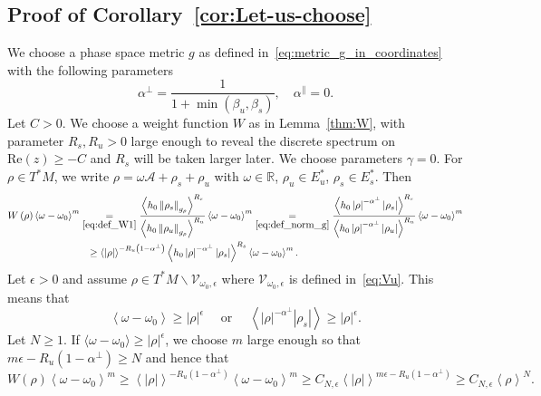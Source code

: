 \documentclass[AHL,Unicode,longabstracts,published]{cedram}
\newcommand{\clV}{\mathcal{V}}
\newcommand{\Ree}{\mathrm{Re}}
\newcommand{\bbR}{\mathbb{R}}
\newcommand{\scrA}{\mathscr{A}}
\newcommand{\Ree}{\mathrm{Re}}
\newcommand{\bbR}{\mathbb{R}}
\begin{document}
\subsection{\label{subsec:Proof-of-Corollary}
Proof of Corollary~\ref{cor:Let-us-choose}}

We choose a phase space metric $g$ as defined in~\eqref{eq:metric_g_in_coordinates} with the following parameters
\[
\alpha^{\perp}=\frac{1}{1+\min\left(\beta_{u},\beta_{s}\right)},\quad\alpha^{\parallel}=0.
\]
Let $C>0$. We choose a weight function $W$ as in Lemma~\ref{thm:W}, with parameter $R_{s},R_{u}>0$ large enough to reveal the discrete spectrum on $\Ree(z)\geq-C$ and $R_{s}$ will be taken larger later. We choose parameters $\gamma=0$. For $\rho\in T^{*}M$, we write $\rho=\omega\scrA+\rho_{s}+\rho_{u}$ with $\omega\in\bbR$, $\rho_{u}\in E_{u}^{*}$, $\rho_{s}\in E_{s}^{*}$. Then
\begin{align*}
W\left(\rho\right)\left\langle \omega-\omega_{0}\right\rangle ^{m} & \underset{\eqref{eq:def_W1}}{=}\frac{\left\langle h_{0}\left\Vert \rho_{s}\right\Vert _{g_{\rho}}\right\rangle ^{R_{s}}}{\left\langle h_{0}\left\Vert \rho_{u}\right\Vert _{g_{\rho}}\right\rangle ^{R_{u}}}\left\langle \omega-\omega_{0}\right\rangle ^{m}\underset{\eqref{eq:def_norm_g}}{=}\frac{\left\langle h_{0}\left|\rho\right|^{-\alpha^{\perp}}\left|\rho_{s}\right|\right\rangle ^{R_{s}}}{\left\langle h_{0}\left|\rho\right|^{-\alpha^{\perp}}\left|\rho_{u}\right|\right\rangle ^{R_{u}}}\left\langle \omega-\omega_{0}\right\rangle ^{m}\\
& \mkern13mu\geq\left\langle \left|\rho\right|\right\rangle ^{-R_{u}\left(1-\alpha^{\perp}\right)}\left\langle h_{0}\left|\rho\right|^{-\alpha^{\perp}}\left|\rho_{s}\right|\right\rangle ^{R_{s}}\left\langle \omega-\omega_{0}\right\rangle ^{m}.
\end{align*}
Let $\epsilon>0$ and assume $\rho\in T^{*}M\backslash\clV_{\omega_{0},\epsilon}$ where $\clV_{\omega_{0},\epsilon}$ is defined in~\eqref{eq:Vu}. This means that
\[
\left\langle \omega-\omega_{0}\right\rangle \geq\left|\rho\right|^{\epsilon}\quad\text{ or }\quad\left\langle \left|\rho\right|^{-\alpha^{\perp}}\left|\rho_{s}\right|\right\rangle \geq\left|\rho\right|^{\epsilon}.
\]
Let $N\geq1$. If $\langle \omega-\omega_{0}\rangle \geq|\rho|^{\epsilon}$, we choose $m$ large enough so that $m\epsilon-R_{u}(1-\alpha^{\perp})\geq N$ and hence that
\[
W\left(\rho\right)\left\langle \omega-\omega_{0}\right\rangle ^{m}\geq\left\langle \left|\rho\right|\right\rangle ^{-R_{u}\left(1-\alpha^{\perp}\right)}\left\langle \omega-\omega_{0}\right\rangle ^{m}\geq C_{N,\epsilon}\left\langle \left|\rho\right|\right\rangle ^{m\epsilon-R_{u}\left(1-\alpha^{\perp}\right)}\geq C_{N,\epsilon}\left\langle \rho\right\rangle ^{N}.
\]
\end{document}
